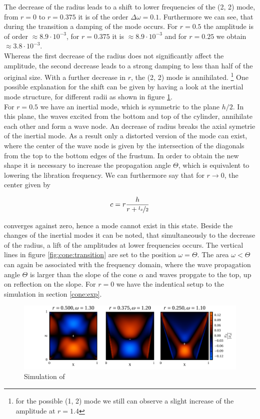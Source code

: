 The decrease of the radius leads to a shift to lower frequencies of the (2, 2) mode,
from $r=0$ to $r=0.375$ it is of the order $\Delta \omega=0.1$.
Furthermore we can see, that during the transition a damping of the mode occurs.
For $r=0.5$ the amplitude is of order $\approx8.9\cdot10^{-3}$, for $r=0.375$ it is
$\approx8.9\cdot10^{-3}$ and for $r=0.25$ we obtain $\approx3.8\cdot10^{-3}$.\\
Whereas the first decrease of the radius does not significantly affect the amplitude,
the second decrease leads to a strong damping to less than half of the original size.
With a further decrease in $r$, the (2, 2) mode is annihilated.
\footnote{ for the possible (1, 2) mode we still can observe a slight increase of the amplitude at $r=1.4$}
One possible explanation for the shift can be given
by having a look at the inertial mode structure, for different radii as shown in figure \ref{fig:cone:phase}.\\
For $r=0.5$ we have an inertial mode, which is symmetric to the plane $h/2$.
In this plane, the waves excited from the bottom and top of the cylinder, annihilate each other and form a wave node.
An decrease of radius breaks the axial symetrie of the inertial mode.
As a result only a distorted version of the mode can exist, where the center of the wave node
is given by the intersection of the diagonals from the top to the bottom edges of the frustum.
In order to obtain the new shape it is necessary to increase the propagation angle $\Theta$,
which is equivalent to lowering the libration frequency.
We can furthermore say that for $r \rightarrow 0$, the center given by

\begin{align}
c  = r \frac{h}{r+\nicefrac{l_x}{2}}
\end{align}

converges against zero, hence a mode cannot exist in this state.
Beside the changes of the inertial modes it can be noted, that simultaneously to the decrease of the radius,
a lift of the amplitudes at lower frequencies occurs.
The vertical lines in figure \ref{fig:cone:transition} are set to the position $\omega=\Theta$.
The area $\omega<\Theta$ can again be associated with the frequency domain, where the wave propagation angle $\Theta$ is larger than
the  slope of the cone $\alpha$ and waves propgate to the top, up on reflection on the slope.
For $r=0$ we have the indentical setup to the simulation in section \ref{cone:exp}.

\begin{figure}[!pt]
  \centering
  \includegraphics{gfx/cone/transition/phase.pdf}
  \caption{\label{fig:cone:phase}
    Simulation of
  }
\end{figure}

